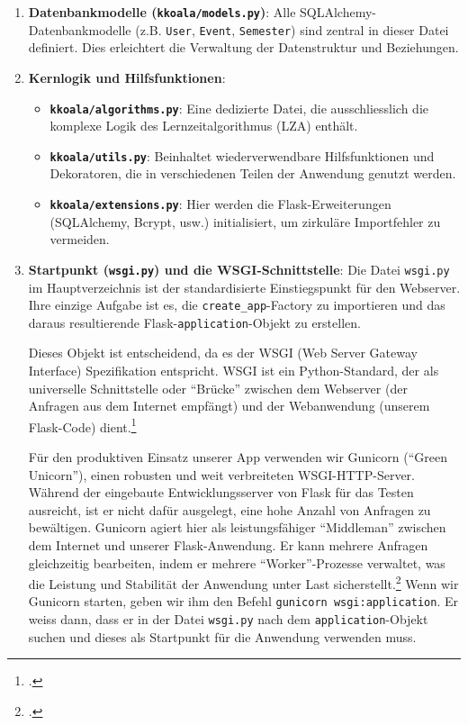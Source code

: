 \documentclass[12pt,a4paper]{report}
\begin{document}
\begin{enumerate}
    \item \textbf{Datenbankmodelle (\texttt{kkoala/models.py})}:
    Alle SQLAlchemy-Datenbankmodelle (z.B. \texttt{User}, \texttt{Event}, \texttt{Semester}) sind zentral in dieser Datei definiert. Dies erleichtert die Verwaltung der Datenstruktur und Beziehungen.

    \item \textbf{Kernlogik und Hilfsfunktionen}:
    \begin{itemize}
        \item \textbf{\texttt{kkoala/algorithms.py}}: Eine dedizierte Datei, die ausschliesslich die komplexe Logik des Lernzeitalgorithmus (LZA) enthält.
        \item \textbf{\texttt{kkoala/utils.py}}: Beinhaltet wiederverwendbare Hilfsfunktionen und Dekoratoren, die in verschiedenen Teilen der Anwendung genutzt werden.
        \item \textbf{\texttt{kkoala/extensions.py}}: Hier werden die Flask-Erweiterungen (SQLAlchemy, Bcrypt, usw.) initialisiert, um zirkuläre Importfehler zu vermeiden.
    \end{itemize}
    
    \item \textbf{Startpunkt (\texttt{wsgi.py}) und die WSGI-Schnittstelle}:
    Die Datei \texttt{wsgi.py} im Hauptverzeichnis ist der standardisierte Einstiegspunkt für den Webserver. Ihre einzige Aufgabe ist es, die \texttt{create\_app}-Factory zu importieren und das daraus resultierende Flask-\texttt{application}-Objekt zu erstellen.

    Dieses Objekt ist entscheidend, da es der WSGI (Web Server Gateway Interface) Spezifikation entspricht. WSGI ist ein Python-Standard, der als universelle Schnittstelle oder \enquote{Brücke} zwischen dem Webserver (der Anfragen aus dem Internet empfängt) und der Webanwendung (unserem Flask-Code) dient.\footcite{chaitanya_srivastav_wsgi}

    Für den produktiven Einsatz unserer App verwenden wir Gunicorn (\enquote{Green Unicorn}), einen robusten und weit verbreiteten WSGI-HTTP-Server. Während der eingebaute Entwicklungsserver von Flask für das Testen ausreicht, ist er nicht dafür ausgelegt, eine hohe Anzahl von Anfragen zu bewältigen. Gunicorn agiert hier als leistungsfähiger \enquote{Middleman} zwischen dem Internet und unserer Flask-Anwendung. Er kann mehrere Anfragen gleichzeitig bearbeiten, indem er mehrere \enquote{Worker}-Prozesse verwaltet, was die Leistung und Stabilität der Anwendung unter Last sicherstellt.\footcite{codesignal_gunicorn} Wenn wir Gunicorn starten, geben wir ihm den Befehl \texttt{gunicorn wsgi:application}. Er weiss dann, dass er in der Datei \texttt{wsgi.py} nach dem \texttt{application}-Objekt suchen und dieses als Startpunkt für die Anwendung verwenden muss.
\end{enumerate}
\end{document}
